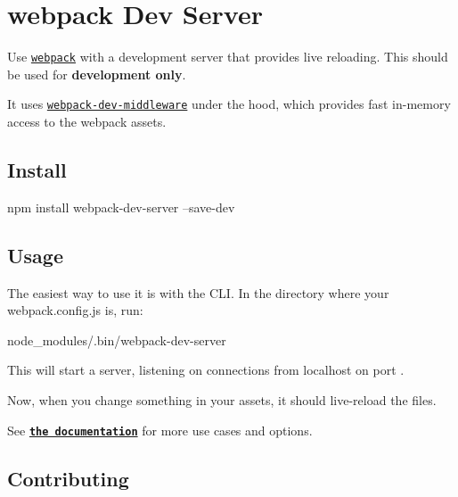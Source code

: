 \href{https://npmjs.com/package/webpack-dev-server}{\tt } \href{https://nodejs.org}{\tt } \href{https://david-dm.org/webpack/webpack-dev-server}{\tt } \href{https://travis-ci.org/webpack/webpack-dev-server}{\tt } \href{https://codecov.io/gh/webpack/webpack-dev-server}{\tt } \href{https://gitter.im/webpack/webpack}{\tt }

 \href{https://github.com/webpack/webpack}{\tt } \section*{webpack Dev Server}

 

Use \href{https://webpack.js.org}{\tt webpack} with a development server that provides live reloading. This should be used for {\bfseries development only}.

It uses \href{https://github.com/webpack/webpack-dev-middleware}{\tt webpack-\/dev-\/middleware} under the hood, which provides fast in-\/memory access to the webpack assets.

\subsection*{Install}


\begin{DoxyCode}
npm install webpack-dev-server --save-dev
\end{DoxyCode}


\subsection*{Usage}

The easiest way to use it is with the C\+LI. In the directory where your {\ttfamily webpack.\+config.\+js} is, run\+:


\begin{DoxyCode}
node\_modules/.bin/webpack-dev-server
\end{DoxyCode}


This will start a server, listening on connections from {\ttfamily localhost} on port {}.

Now, when you change something in your assets, it should live-\/reload the files.

See \href{https://webpack.js.org/configuration/dev-server/#devserver}{\tt {\bfseries the documentation}} for more use cases and options.

\subsection*{Contributing}

